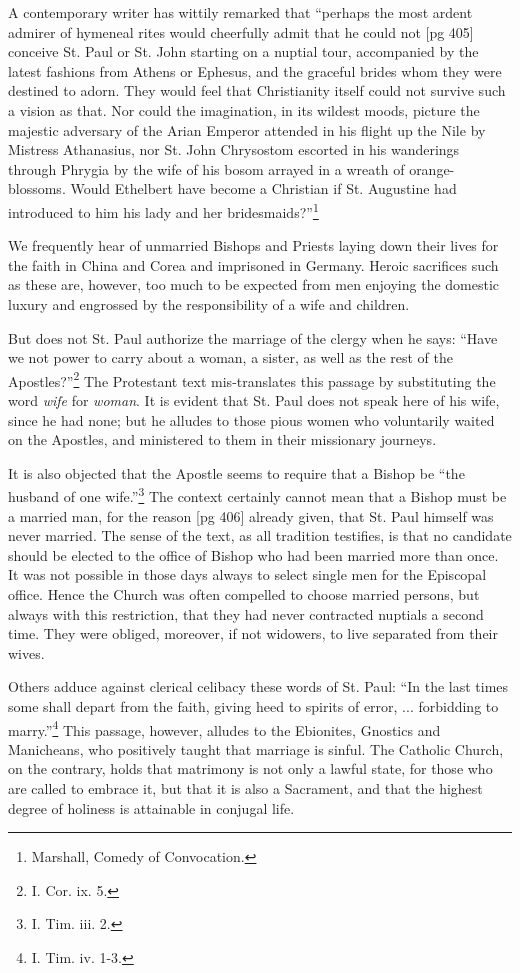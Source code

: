 A contemporary writer has wittily remarked
that “perhaps the most ardent admirer of hymeneal
rites would cheerfully admit that he could not
[pg 405]
conceive St. Paul or St. John starting on a nuptial
tour, accompanied by the latest fashions from
Athens or Ephesus, and the graceful brides whom
they were destined to adorn. They would feel
that Christianity itself could not survive such a
vision as that. Nor could the imagination, in its
wildest moods, picture the majestic adversary of
the Arian Emperor attended in his flight up the
Nile by Mistress Athanasius, nor St. John Chrysostom
escorted in his wanderings through Phrygia
by the wife of his bosom arrayed in a wreath
of orange-blossoms. Would Ethelbert have become
a Christian if St. Augustine had introduced
to him his lady and her bridesmaids?”\footnote{Marshall,
Comedy of Convocation.}

We frequently hear of unmarried Bishops and
Priests laying down their lives for the faith in
China and Corea and imprisoned in Germany.
Heroic sacrifices such as these are, however, too
much to be expected from men enjoying the domestic
luxury and engrossed by the responsibility
of a wife and children.

But does not St. Paul authorize the marriage of
the clergy when he says: “Have we not power to
carry about a woman, a sister, as well as the rest
of the Apostles?”\footnote{I. Cor. ix. 5.}
The Protestant text mis-translates
this passage by substituting the word
\emph{wife} for \emph{woman}. It is evident that St. Paul does
not speak here of his wife, since he had none; but
he alludes to those pious women who voluntarily
waited on the Apostles, and ministered to them in
their missionary journeys.

It is also objected that the Apostle seems to require
that a Bishop be “the husband of one
wife.”\footnote{I. Tim. iii. 2.}
The context certainly cannot mean that
a Bishop must be a married man, for the reason
[pg 406]
already given, that St. Paul himself was never
married. The sense of the text, as all tradition
testifies, is that no candidate should be elected to
the office of Bishop who had been married more
than once. It was not possible in those days always
to select single men for the Episcopal office.
Hence the Church was often compelled to choose
married persons, but always with this restriction,
that they had never contracted nuptials a second
time. They were obliged, moreover, if not widowers,
to live separated from their wives.

Others adduce against clerical celibacy these
words of St. Paul: “In the last times some shall
depart from the faith, giving heed to spirits of
error, ... forbidding to marry.”\footnote{I.
Tim. iv. 1-3.} This passage,
however, alludes to the Ebionites, Gnostics and
Manicheans, who positively taught that marriage
is sinful. The Catholic Church, on the contrary,
holds that matrimony is not only a lawful state,
for those who are called to embrace it, but that it
is also a Sacrament, and that the highest degree
of holiness is attainable in conjugal life.

